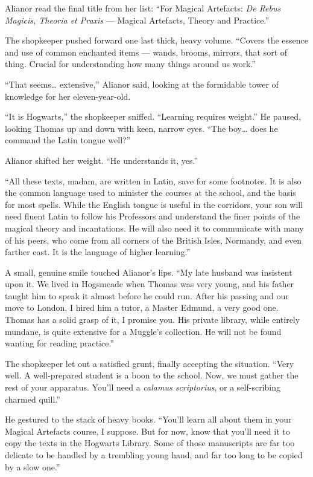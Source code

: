 Alianor read the final title from her list: \enquote{For Magical Artefacts: \textit{De Rebus Magicis, Theoria et Praxis} --- Magical Artefacts, Theory and Practice.}
 
The shopkeeper pushed forward one last thick, heavy volume. \enquote{Covers the essence and use of common enchanted items --- wands, brooms, mirrors, that sort of thing. Crucial for understanding how many things around us work.}
 
\enquote{That seems\ldots{} extensive,} Alianor said, looking at the formidable tower of knowledge for her eleven-year-old.
 
\enquote{It is Hogwarts,} the shopkeeper sniffed. \enquote{Learning requires weight.} He paused, looking Thomas up and down with keen, narrow eyes. \enquote{The boy\ldots{} does he command the Latin tongue well?}
 
Alianor shifted her weight. \enquote{He understands it, yes.}
 
\enquote{All these texts, madam, are written in Latin, save for some footnotes. It is also the common language used to minister the courses at the school, and the basis for most spells. While the English tongue is useful in the corridors, your son will need fluent Latin to follow his Professors and understand the finer points of the magical theory and incantations. He will also need it to communicate with many of his peers, who come from all corners of the British Isles, Normandy, and even farther east. It is the language of higher learning.}
 
A small, genuine smile touched Alianor's lips. \enquote{My late husband was insistent upon it. We lived in Hogsmeade when Thomas was very young, and his father taught him to speak it almost before he could run. After his passing and our move to London, I hired him a tutor, a Master Edmund, a very good one. Thomas has a solid grasp of it, I promise you. His private library, while entirely mundane, is quite extensive for a Muggle's collection. He will not be found wanting for reading practice.}
 
The shopkeeper let out a satisfied grunt, finally accepting the situation. \enquote{Very well. A well-prepared student is a boon to the school. Now, we must gather the rest of your apparatus. You'll need a \textit{calamus scriptorius}, or a self-scribing charmed quill.}
 
He gestured to the stack of heavy books. \enquote{You'll learn all about them in your Magical Artefacts course, I suppose. But for now, know that you'll need it to copy the texts in the Hogwarts Library. Some of those manuscripts are far too delicate to be handled by a trembling young hand, and far too long to be copied by a slow one.}
 
